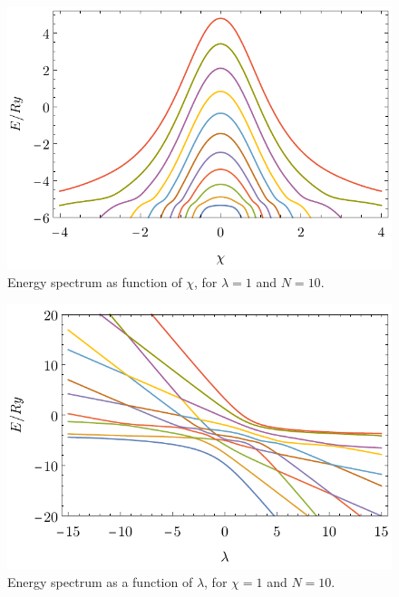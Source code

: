 \begin{figure}[H]
    \centering
    \includegraphics{../img/N=10_energiesl.pdf}
    \caption{Energy spectrum as function of $\chi$, for $\lambda=1$ and $N=10$.}
    \label{fig:N=10_energiesl}    
\end{figure}
\begin{figure}[H]
    \centering
    \includegraphics{../img/N=10_energies2.pdf}
    \caption{Energy spectrum as a function of $\lambda$, for $\chi=1$ and $N=10$.}
    \label{fig:N=10_energies2}    
\end{figure}

